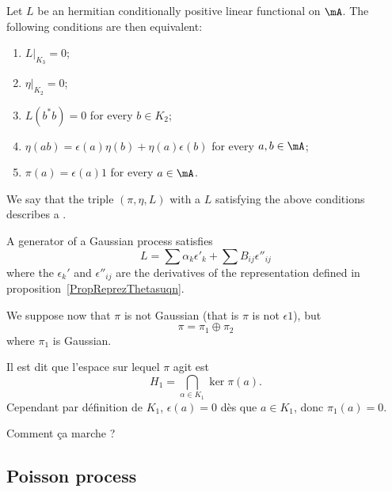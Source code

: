 \begin{proposition}     \label{PropProcessusGaussien}
    Let $L$ be an hermitian conditionally positive linear functional on $\mA$. The following conditions are then equivalent:
    \begin{enumerate}
        \item
            $L|_{K_3}=0$;
        \item
            $\eta|_{K_2}=0$;
        \item
            $L(b^*b)=0$ for every $b\in K_2$;
        \item
            $\eta(ab)=\epsilon(a)\eta(b)+\eta(a)\epsilon(b)$ for every $a,b\in\mA$;
        \item
            $\pi(a)=\epsilon(a)1$ for every $a\in\mA$.
    \end{enumerate}
\end{proposition}
We say that the triple $(\pi,\eta,L)$ with a $L$ satisfying the above conditions describes a .

\begin{proposition}
    A generator of a Gaussian process satisfies
    \begin{equation}
        L=\sum\alpha_k\epsilon'_k+\sum B_{ij}\epsilon''_{ij}
    \end{equation}
    where the $\epsilon_k'$ and $\epsilon''_{ij}$ are the derivatives of the representation defined in proposition~\ref{PropReprezThetasuqn}.
\end{proposition}

We suppose now that $\pi$ is not Gaussian (that is $\pi$ is not $\epsilon 1$), but
\begin{equation}
    \pi=\pi_1\oplus\pi_2
\end{equation}
where $\pi_1$ is Gaussian.

\begin{probleme}
    Il est dit que l'espace sur lequel $\pi$ agit est
    \begin{equation}
        H_1=\bigcap_{\alpha\in K_1}\ker\pi(a).
    \end{equation}
    Cependant par définition de $K_1$, $\epsilon(a)=0$ dès que $a\in K_1$, donc $\pi_1(a)=0$.

    Comment ça marche ?
\end{probleme}

\subsection{Poisson process}

